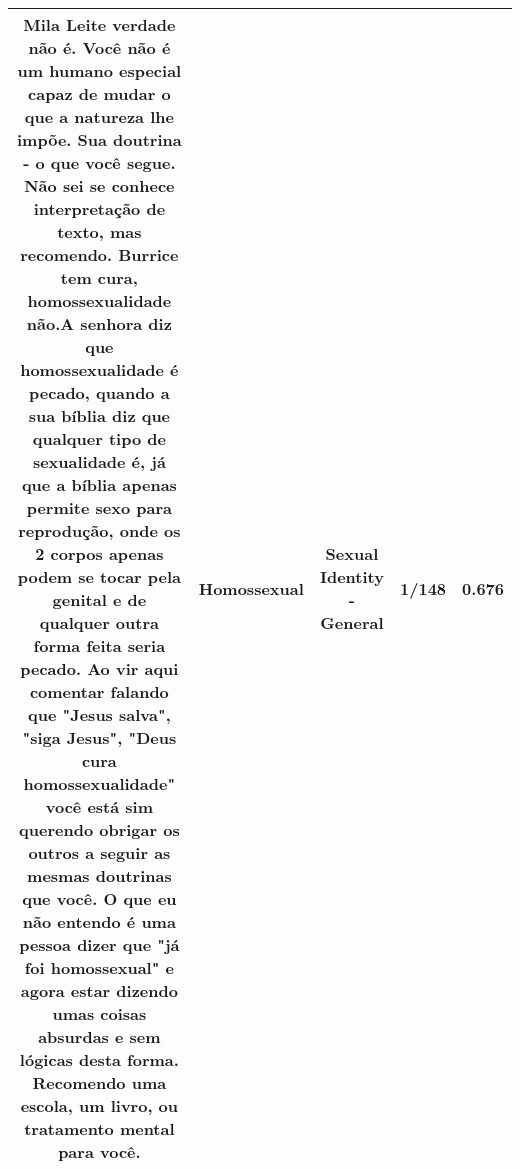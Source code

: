 \documentclass[11pt]{article}
\newlength\mylength
\begin{document}
\begin{center}
\begin{longtable}{|C{.65\mylength}|C{.30\mylength}|C{.12\mylength}|C{.12\mylength}|C{.12\mylength}|}
  \small Mila Leite verdade não é. Você não é um humano especial capaz de mudar o que a natureza lhe impõe. Sua doutrina - o que você segue. Não sei se conhece interpretação de texto, mas recomendo. Burrice tem cura, homossexualidade não.A senhora diz que homossexualidade é pecado, quando a sua bíblia diz que qualquer tipo de sexualidade é, já que a bíblia apenas permite sexo para reprodução, onde os 2 corpos apenas podem se tocar pela genital e de qualquer outra forma feita seria pecado. Ao vir aqui comentar falando que "Jesus salva", "siga Jesus", "Deus cura homossexualidade" você está sim querendo obrigar os outros a seguir as mesmas doutrinas que você. O que eu não entendo é uma pessoa dizer que "já foi \textbf{homossexual}" e agora estar dizendo umas coisas absurdas e sem lógicas desta forma. Recomendo uma escola, um livro, ou tratamento mental para você.\normalsize   & Homossexual & Sexual Identity - General & 1/148 & 0.676 \\  \hline

\end{longtable}
\end{center}
\end{document}
